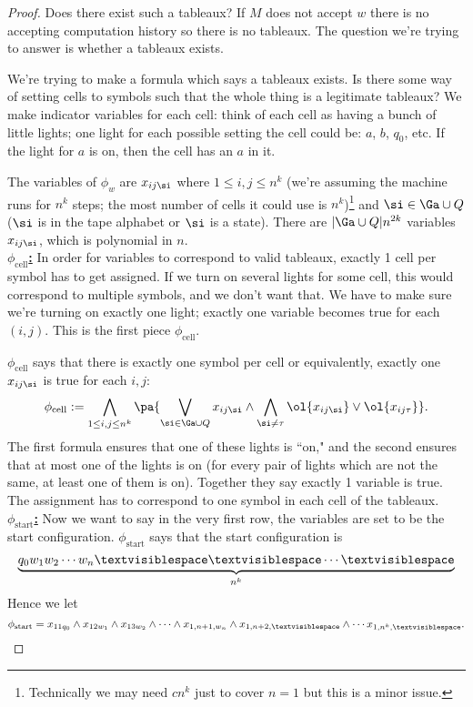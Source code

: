\begin{proof}

Does there exist such a tableaux? If $M$ does not accept $w$ there is no accepting computation history so there is no tableaux. The question we're trying to answer is whether a tableaux exists.

We're trying to make a formula which says a tableaux exists. Is there some way of setting cells to symbols such that the whole thing is a legitimate tableaux? We make indicator variables for each cell: think of each cell as having a bunch of little lights; one light for each possible setting the cell could be: $a$, $b$, $q_0$, etc. If the light for $a$ is on, then the cell has an $a$ in it. %

The variables of $\phi_w$ are $x_{ij\si}$ where $1\le i,j\le n^k$ (we're assuming the machine runs for $n^k$ steps; the most number of cells it could use is $n^k$)\footnote{Technically we may need $cn^k$ just to cover $n=1$ but this is a minor issue.} and $\si\in \Ga\cup Q$ ($\si$ is in the tape alphabet or $\si$ is a state). There are $|\Ga\cup Q|n^{2k}$ variables $x_{ij\si}$, which is polynomial in $n$.\\

\noindent
\ul{\textbf{$\phi_{\text{cell}}$:}} 
In order for variables to correspond to valid tableaux, exactly 1 cell per symbol has to get assigned. If we turn on several lights for some cell, this would correspond to multiple symbols, and we don't want that. We have to make sure we're turning on exactly one light; exactly one variable becomes true for each $(i,j)$. This is the first piece $\phi_{\text{cell}}$. %

$\phi_{\text{cell}}$ says that there is exactly one symbol per cell or equivalently, exactly one $x_{ij\si}$ is true for each $i,j$:
\[
\phi_{\text{cell}}:=
\bigwedge_{1\le i,j\le n^k} 
\pa{\bigvee_{\si\in \Ga\cup Q} x_{ij\si}
\wedge \bigwedge_{\si\ne \tau} \ol{x_{ij\si}}\vee \ol{x_{ij\tau}}}.
\]
The first formula ensures that one of these lights is ``on," and the second ensures that at most one of the lights is on (for every pair of lights which are not the same, at least one of them is on). Together they say exactly 1 variable is true. The assignment has to correspond to one symbol in each cell of the tableaux.\\

\noindent
\ul{\textbf{$\phi_{\text{start}}$:}} 
Now we want to say in the very first row, the variables are set to be  the start configuration. $\phi_{\text{start}}$ says that the start configuration is
\[
\underbrace{q_0w_1w_2\cdots w_n\textvisiblespace\textvisiblespace\cdots \textvisiblespace}_{n^k}
\]
Hence  we let
\[
\phi_{\text{start}}=x_{11q_0}\wedge x_{12w_1}\wedge x_{13w_2}\wedge \cdots \wedge x_{1,n+1,w_n}\wedge x_{1,n+2,\textvisiblespace}\wedge \cdots x_{1,n^k,\textvisiblespace}.
\]


\end{proof}
